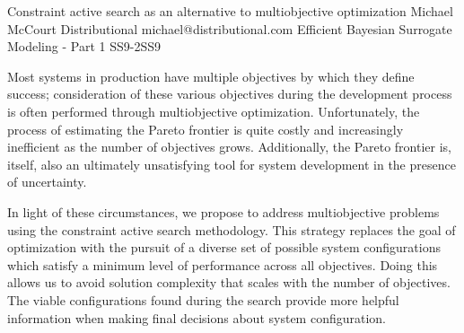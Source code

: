 \begin{talk}
  {Constraint active search as an alternative to multiobjective optimization}%
  {Michael McCourt}%
  {Distributional}%
  {michael@distributional.com}%
  {}%
{Efficient Bayesian Surrogate Modeling - Part 1}
{}{SS9-2}{SS9}

			
Most systems in production have multiple objectives by which they define success; consideration of these various objectives during the development process is often performed through multiobjective optimization.  Unfortunately, the process of estimating the Pareto frontier is quite costly and increasingly inefficient as the number of objectives grows.  Additionally, the Pareto frontier is, itself, also an ultimately unsatisfying tool for system development in the presence of uncertainty.

In light of these circumstances, we propose to address multiobjective problems using the constraint active search methodology.  This strategy replaces the goal of optimization with the pursuit of a diverse set of possible system configurations which satisfy a minimum level of performance across all objectives.  Doing this allows us to avoid solution complexity that scales with the number of objectives.  The viable configurations found during the search provide more helpful information when making final decisions about system configuration.

\end{talk}

